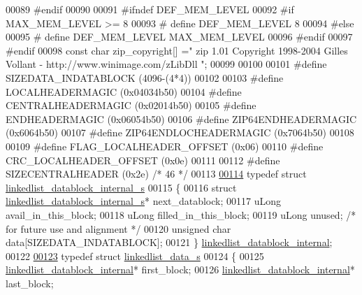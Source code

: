 \begin{DoxyCode}
00089 \textcolor{preprocessor}{#endif}
00090 
00091 \textcolor{preprocessor}{#ifndef DEF\_MEM\_LEVEL}
00092 \textcolor{preprocessor}{#if MAX\_MEM\_LEVEL >= 8}
00093 \textcolor{preprocessor}{#  define DEF\_MEM\_LEVEL 8}
00094 \textcolor{preprocessor}{#else}
00095 \textcolor{preprocessor}{#  define DEF\_MEM\_LEVEL  MAX\_MEM\_LEVEL}
00096 \textcolor{preprocessor}{#endif}
00097 \textcolor{preprocessor}{#endif}
00098 \textcolor{keyword}{const} \textcolor{keywordtype}{char} zip\_copyright[] =\textcolor{stringliteral}{" zip 1.01 Copyright 1998-2004 Gilles Vollant - http://www.winimage.com/zLibDll
      "};
00099 
00100 
00101 \textcolor{preprocessor}{#define SIZEDATA\_INDATABLOCK (4096-(4*4))}
00102 
00103 \textcolor{preprocessor}{#define LOCALHEADERMAGIC    (0x04034b50)}
00104 \textcolor{preprocessor}{#define CENTRALHEADERMAGIC  (0x02014b50)}
00105 \textcolor{preprocessor}{#define ENDHEADERMAGIC      (0x06054b50)}
00106 \textcolor{preprocessor}{#define ZIP64ENDHEADERMAGIC      (0x6064b50)}
00107 \textcolor{preprocessor}{#define ZIP64ENDLOCHEADERMAGIC   (0x7064b50)}
00108 
00109 \textcolor{preprocessor}{#define FLAG\_LOCALHEADER\_OFFSET (0x06)}
00110 \textcolor{preprocessor}{#define CRC\_LOCALHEADER\_OFFSET  (0x0e)}
00111 
00112 \textcolor{preprocessor}{#define SIZECENTRALHEADER (0x2e) }\textcolor{comment}{/* 46 */}\textcolor{preprocessor}{}
00113 
\hyperlink{structlinkedlist__datablock__internal__s}{00114} \textcolor{keyword}{typedef} \textcolor{keyword}{struct }\hyperlink{structlinkedlist__datablock__internal__s}{linkedlist\_datablock\_internal\_s}
00115 \{
00116   \textcolor{keyword}{struct }\hyperlink{structlinkedlist__datablock__internal__s}{linkedlist\_datablock\_internal\_s}* next\_datablock;
00117   uLong  avail\_in\_this\_block;
00118   uLong  filled\_in\_this\_block;
00119   uLong  unused; \textcolor{comment}{/* for future use and alignment */}
00120   \textcolor{keywordtype}{unsigned} \textcolor{keywordtype}{char} data[SIZEDATA\_INDATABLOCK];
00121 \} \hyperlink{structlinkedlist__datablock__internal__s}{linkedlist\_datablock\_internal};
00122 
\hyperlink{structlinkedlist__data__s}{00123} \textcolor{keyword}{typedef} \textcolor{keyword}{struct }\hyperlink{structlinkedlist__data__s}{linkedlist\_data\_s}
00124 \{
00125     \hyperlink{structlinkedlist__datablock__internal__s}{linkedlist\_datablock\_internal}* first\_block;
00126     \hyperlink{structlinkedlist__datablock__internal__s}{linkedlist\_datablock\_internal}* last\_block;

\end{DoxyCode}
